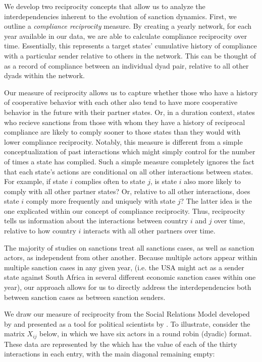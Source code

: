 We develop two reciprocity concepts that allow us to analyze the interdependencies inherent to the evolution of sanction dynamics. First, we outline a \textit{compliance reciprocity} measure. By creating a yearly network, for each year available in our data, we are able to calculate compliance reciprocity over time. Essentially, this represents a target states' cumulative history of compliance with a particular sender relative to others in the network. This can be thought of as a record of compliance between an individual dyad pair, relative to all other dyads within the network. 

 Our measure of reciprocity allows us to capture whether those who have a history of cooperative behavior with each other also tend to have more cooperative behavior in the future with their partner states. Or, in a duration context, states who recieve sanctions from those with whom they have a history of reciprocal compliance are likely to comply sooner to those states than they would with lower compliance reciprocity. Notably, this measure is different from a simple conceptualization of past interactions which might simply control for the number of times a state has complied. Such a simple measure completely ignores the fact that each state's actions are conditional on all other interactions between states. For example, if state $i$ complies often to state $j$, is state $i$ also more likely to comply with all other partner states? Or, relative to all other interactions, does state $i$ comply more frequently and uniquely with state $j$? The latter idea is the one explicated within our  concept of compliance reciprocity. Thus, reciprocity tells us information about the interactions between country $i$ and $j$ over time, relative to how country $i$ interacts with all other partners over time. 

 The majority of studies on sanctions treat all sanctions cases, as well as sanction actors, as independent from other another. Because multiple actors appear within multiple sanction cases in any given year, (i.e. the USA might act as a sender state against South Africa in several different economic sanction cases within one year), our approach allows for us to directly address the interdependencies both between sanction cases as between sanction senders. 

We draw our measure of reciprocity from the Social Relations Model developed by \citet{kenny1994interpersonal} and presented as a tool for political scientists by \cite{dorff2013}. To illustrate, consider the matrix $X_{ij}$ below, in which we have six actors in a round robin (dyadic) format. These data are represented by the  which has the  value of each of the thirty interactions in each entry, with the main diagonal remaining empty:

